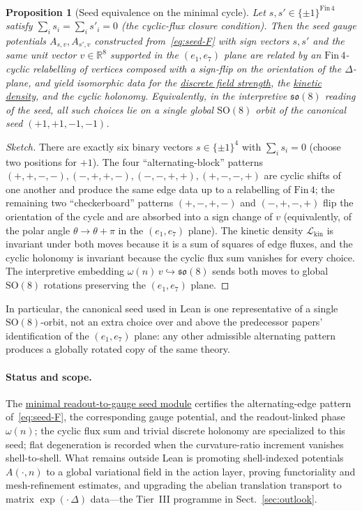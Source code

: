 \documentclass[11pt]{amsart}
\newtheorem{proposition}[theorem]{Proposition}
\begin{document}
\begin{proposition}[Seed equivalence on the minimal cycle]
\label{prop:seed-equivalence}
Let \(s,s'\in\{\pm 1\}^{\mathrm{Fin}\,4}\) satisfy \(\sum_i s_i=\sum_i s'_i=0\) (the cyclic-flux closure condition). Then the seed gauge potentials \(A_{s,v},A_{s',v}\) constructed from~\eqref{eq:seed-F} with sign vectors \(s,s'\) and the same unit vector \(v\in\mathbb{R}^8\) supported in the \((e_1,e_7)\) plane are related by an \(\mathrm{Fin}\,4\)-cyclic relabelling of vertices composed with a sign-flip on the orientation of the \(\Delta\)-plane, and yield isomorphic data for the \hyperref[lean:F-from-A]{discrete field strength}, the \hyperref[lean:LO-kinetic]{kinetic density}, and the cyclic holonomy. Equivalently, in the \emph{interpretive} \(\mathfrak{so}(8)\) reading of the seed, all such choices lie on a single global \(\mathrm{SO}(8)\) orbit of the canonical seed \((+1,+1,-1,-1)\).
\end{proposition}

\begin{proof}[Sketch]
There are exactly six binary vectors \(s\in\{\pm 1\}^4\) with \(\sum_i s_i=0\) (choose two positions for \(+1\)). The four ``alternating-block'' patterns \((+,+,-,-),(-,+,+,-),(-,-,+,+),(+,-,-,+)\) are cyclic shifts of one another and produce the same edge data up to a relabelling of \(\mathrm{Fin}\,4\); the remaining two ``checkerboard'' patterns \((+,-,+,-)\) and \((-,+,-,+)\) flip the orientation of the cycle and are absorbed into a sign change of \(v\) (equivalently, of the polar angle \(\theta\to\theta+\pi\) in the \((e_1,e_7)\) plane). The kinetic density \(\mathcal{L}_{\mathrm{kin}}\) is invariant under both moves because it is a sum of squares of edge fluxes, and the cyclic holonomy is invariant because the cyclic flux sum vanishes for every choice. The interpretive embedding \(\omega(n)\,v\hookrightarrow\mathfrak{so}(8)\) sends both moves to global \(\mathrm{SO}(8)\) rotations preserving the \((e_1,e_7)\) plane.
\end{proof}

In particular, the canonical seed used in Lean is one representative of a single \(\mathrm{SO}(8)\)-orbit, not an extra choice over and above the predecessor papers' identification of the \((e_1,e_7)\) plane: any other admissible alternating pattern produces a globally rotated copy of the same theory.

\paragraph{Status and scope.}
The \hyperref[lean:readout-seed]{minimal readout-to-gauge seed module} certifies the alternating-edge pattern of~\eqref{eq:seed-F}, the corresponding gauge potential, and the readout-linked phase \(\omega(n)\); the cyclic flux sum and trivial discrete holonomy are specialized to this seed; flat degeneration is recorded when the curvature-ratio increment vanishes shell-to-shell. What remains outside Lean is promoting shell-indexed potentials \(A(\cdot,n)\) to a global variational field in the action layer, proving functoriality and mesh-refinement estimates, and upgrading the abelian translation transport to matrix \(\exp(\cdot\,\Delta)\) data---the Tier~III programme in Sect.~\ref{sec:outlook}.
\end{document}
